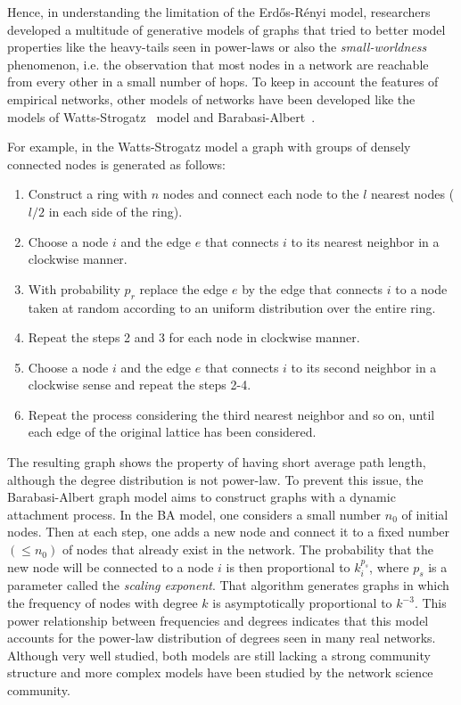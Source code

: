 Hence, in understanding the limitation of the Erd\H{o}s-Rényi model, researchers developed a multitude of generative models of graphs that tried to better model properties like the heavy-tails seen in power-laws or also the \emph{small-worldness} phenomenon, i.e. the observation that most nodes in a network are reachable from every other in a small number of hops.
To keep in account the features of empirical networks, other models of networks have been developed like the models of Watts-Strogatz~\cite{Watts1998} model and Barabasi-Albert~\cite{Barabasi1999}.

For example, in the Watts-Strogatz model a graph with groups of densely connected nodes is generated as follows:
\begin{enumerate}
\item Construct a ring with $n$ nodes and connect each node to the $l$ nearest nodes ($l/2$ in each side of the ring).
\item Choose a node $i$ and the edge $e$ that connects $i$ to its nearest neighbor in a clockwise manner.
\item With probability $p_r$ replace the edge $e$ by the edge that connects $i$ to a node taken at random according to an uniform distribution over the entire ring.
\item Repeat the steps 2 and 3 for each node in clockwise manner.
\item Choose a node $i$ and the edge $e$ that connects $i$ to its second neighbor in a clockwise sense and repeat the steps 2-4.
\item Repeat the process considering the third nearest neighbor and so on, until each edge of the original lattice has been considered.
\end{enumerate}

The resulting graph shows the property of having short average path length, although the degree distribution is not power-law.
To prevent this issue, the Barabasi-Albert graph model aims to construct graphs with a dynamic attachment process.
In the BA model, one considers a small number $n_0$ of initial nodes. Then at each step, one adds a new node and connect it to a fixed number $(\leq n_0)$ of nodes that already exist in the network. The probability that the new node will be connected to a node $i$ is then proportional to $k_i^{p_s}$,  where $p_s$ is a parameter called the \emph{scaling exponent}. That algorithm generates graphs in which the frequency of nodes with degree $k$ is asymptotically proportional to ${k}^{-3}$. This power relationship between frequencies and degrees indicates that this model accounts for the power-law distribution of degrees seen in many real networks.
Although very well studied, both models are still lacking a strong community structure and more complex models have been studied by the network science community.

